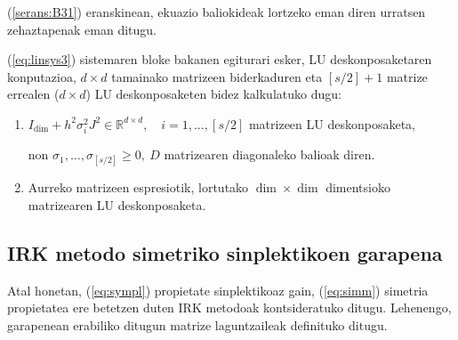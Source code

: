 (\ref{serans:B31}) eranskinean, ekuazio baliokideak lortzeko eman diren urratsen zehaztapenak eman ditugu. 

(\ref{eq:linsys3}) sistemaren  bloke bakanen egiturari esker, LU deskonposaketaren konputazioa, $d \times d$ tamainako matrizeen biderkaduren eta $[s/2]+1$ matrize errealen ($d \times d$) LU deskonposaketen bidez kalkulatuko dugu:
\begin{enumerate}
\item $I_\dim + h^2 \sigma_i^2 J^2 \in \mathbb{R}^{d \times d}, \quad i=1,\ldots,[s/2]$ matrizeen LU deskonposaketa,

non $\sigma_1,\ldots,\sigma_{[s/2]} \geq 0 , \ D$ matrizearen diagonaleko balioak diren.
\item Aurreko matrizeen espresiotik, lortutako $\dim \times \dim$ dimentsioko matrizearen LU deskonposaketa.
\end{enumerate} 


\subsection{IRK metodo simetriko sinplektikoen garapena}
\label{ss:734}

Atal honetan, (\ref{eq:sympl}) propietate sinplektikoaz gain, (\ref{eq:simm}) simetria propietatea  ere betetzen duten IRK metodoak kontsideratuko ditugu. Lehenengo, garapenean erabiliko ditugun matrize laguntzaileak definituko ditugu.

